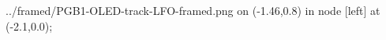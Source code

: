 \documentclass[preview]{standalone}
\begin{document}
\begin{zoomed}{../framed/PGB1-OLED-track-LFO-framed.png}
  \spy [gray, size=2.5cm] on (-1.46,0.8) in node [left] at (-2.1,0.0);
\end{zoomed}
\end{document}
